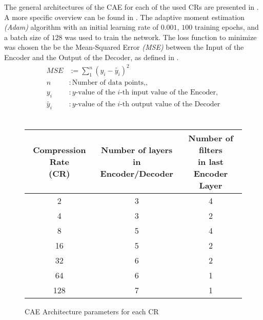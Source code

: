 The general architectures of the CAE for each of the used CRs are presented in .
A more specific overview can be found in .
The adaptive moment estimation \textit{(Adam)} algorithm \cite{kingma2014adam} with an initial learning rate of $0.001$, $100$ training epochs, and a batch size of $128$ was used to train the network. 
The loss function to minimize was chosen the be the Mean-Squared Error \textit{(MSE)} between the Input of the Encoder and the Output of the Decoder, as defined in .
\begin{equation}
	\begin{split}
		MSE &:= \sum_{1}^{n}(y_i - \tilde{y_i})^2 \\
		n &: \text{Number of data points,}, \\
		y_i &: \text{$y$-value of the $i$-th input value of the Encoder}, \\
		\tilde{y_i} &: \text{$y$-value of the $i$-th output value of the Decoder}
	\end{split}
	\label{eq:mse}
\end{equation}\\
\begin{figure}[h]
	\centering
	\begin{tabular}{|c|c|c|}
		\hline
		\makecell{Compression Rate  \\ (CR)} & \makecell{ Number of layers \\ in Encoder/Decoder} & \makecell{Number of filters \\ in last Encoder Layer} \\
		\hline
		2 & 3 & 4 \\
		\hline
		4 & 3 & 2 \\
		\hline
		8 & 5 & 4 \\
		\hline
		16 & 5 & 2 \\
		\hline
		32 & 6 & 2 \\
		\hline
		64 & 6 & 1 \\
		\hline
		128 & 7 & 1 \\
		\hline
	\end{tabular}

 \caption{CAE Architecture parameters for each CR}
 \label{fig:CrTable}
\end{figure}
\FloatBarrier

